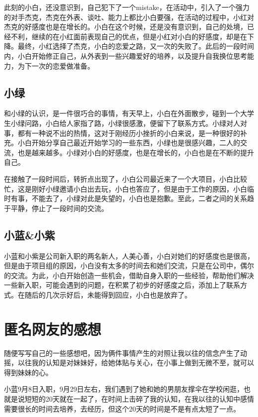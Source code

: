 \documentclass{article}
\begin{document}
此刻的小白，还没意识到，自己犯下了一个mistake，在活动中，引入了一个强力的对手杰克，杰克在外表、谈吐、能力上都比小白要强，在活动的过程中，小红对杰克的好感度也是在增长的。小白在这个时候，还是没有意识到，自己的处境，已经不利，继续的在小红面前表现自己的优点，但是小红对小白的好感度，却是在下降。最终，小红选择了杰克，小白的恋爱之路，又一次的失败了。此后的一段时间内，小白开始修正自己，从外表到一些兴趣爱好的培养，以及提升自我换位思考能力，为下一次的恋爱做准备。

\subsection{小绿}

和小绿的认识，是一件很巧合的事情，有天早上，小白在外面散步，碰到一个大学生小绿问路，小白给人家指了路，小绿很感激，便留下了联系方式。小绿对人对事，都有一种说不出的热情，这对于刚经历小挫折的小白来说，是一种很好的补充。小白开始分享自己最近开始学习的一些东西，小绿也是很感兴趣，二人的交流，也是越来越多。小绿对小白的好感度，也是在增长的，小白也是在不断的提升自己。

在接触了一段时间后，转折点出现了，小白公司最近来了一个大项目，小白比较忙，这是刚好小绿邀请小白出去玩，小白也答应了，但是由于工作的原因，小白临时有事，不能去了，小绿对此是失望的，小白也是抱歉。至此，二者之间的关系趋于平静，停止了一段时间的交流。

\subsection{小蓝\&小紫}

小蓝和小紫是公司新入职的两名新人，人美心善，小白对她们的好感度也是很高，但是由于项目组的原因，小白没有太多的时间去和她们交流，只是在公司中，偶尔的交流。为此，小白开始创造一些机会，借助自身入职的一些经验，帮助他们解决一些新入职，可能会遇到的问题，在积累了初步的好感度之后，添加上了联系方式。在随后的几次示好后，未能得到回应，小白也是放弃了。

\section{匿名网友的感想}

随便写写自己的一些感想吧，因为俩件事情产生的对照让我以往的信念产生了动摇，以往我的认知是对妹妹好，给她体贴与关心，在小事上做到无微不至，就可以得到妹妹的心。

小蓝9月8日入职，9月29日左右，我们遇到了她和她的男朋友撑伞在学校闲逛，也就是说短短的20天就在一起了，在时间上击碎了我的认知，在我以往的认知中感情需要很长的时间去培养，去经历，但这个20天的时间是不是有点太短了一点。
\end{document}
